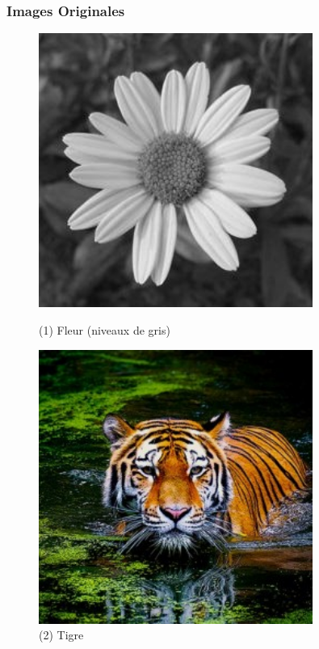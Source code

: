 \subsubsection{Images Originales}

\begin{figure}[h!]
    \centering
    \begin{minipage}[b]{0.45\textwidth}
        \centering
        \includegraphics[width=0.8\textwidth]{images/originals/flower.jpg}
        \caption*{(1) Fleur (niveaux de gris)}
    \end{minipage}
    \begin{minipage}[b]{0.45\textwidth}
        \centering
        \includegraphics[width=0.8\textwidth]{images/originals/tiger.jpeg}
        \caption*{(2) Tigre}
    \end{minipage}
\end{figure}

